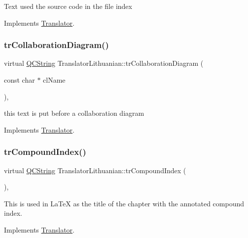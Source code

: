 Text used the source code in the file index 

Implements \mbox{\hyperlink{class_translator}{Translator}}.

\mbox{\label{class_translator_lithuanian_a237f50f92d5b4ec240f8ee1244c5e461}} 
\subsubsection{\texorpdfstring{trCollaborationDiagram()}{trCollaborationDiagram()}}
{\footnotesize\ttfamily virtual \mbox{\hyperlink{class_q_c_string}{Q\+C\+String}} Translator\+Lithuanian\+::tr\+Collaboration\+Diagram (\begin{DoxyParamCaption}\item[{const char $\ast$}]{cl\+Name }\end{DoxyParamCaption})\hspace{0.3cm}{\ttfamily [inline]}, {\ttfamily [virtual]}}

this text is put before a collaboration diagram 

Implements \mbox{\hyperlink{class_translator}{Translator}}.

\mbox{\label{class_translator_lithuanian_a1d4e74c1e2d0699f7780d8fbc7be64df}} 
\subsubsection{\texorpdfstring{trCompoundIndex()}{trCompoundIndex()}}
{\footnotesize\ttfamily virtual \mbox{\hyperlink{class_q_c_string}{Q\+C\+String}} Translator\+Lithuanian\+::tr\+Compound\+Index (\begin{DoxyParamCaption}{ }\end{DoxyParamCaption})\hspace{0.3cm}{\ttfamily [inline]}, {\ttfamily [virtual]}}

This is used in La\+TeX as the title of the chapter with the annotated compound index. 

Implements \mbox{\hyperlink{class_translator}{Translator}}.

